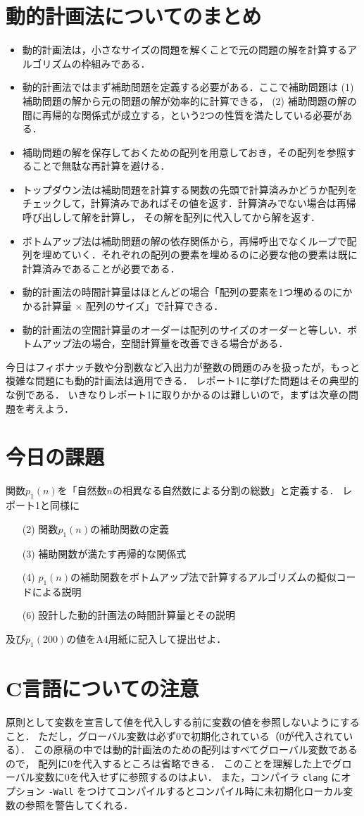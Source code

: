 \documentclass[a4paper,twoside,onecolumn,openany,article]{memoir}
\theoremstyle{remark}
\begin{document}
\section{動的計画法についてのまとめ}
\begin{itemize}
\item 動的計画法は，小さなサイズの問題を解くことで元の問題の解を計算するアルゴリズムの枠組みである．
\item 動的計画法ではまず補助問題を定義する必要がある．ここで補助問題は (1) 補助問題の解から元の問題の解が効率的に計算できる，
(2) 補助問題の解の間に再帰的な関係式が成立する，という2つの性質を満たしている必要がある．
\item 補助問題の解を保存しておくための配列を用意しておき，その配列を参照することで無駄な再計算を避ける．
\item トップダウン法は補助問題を計算する関数の先頭で計算済みかどうか配列をチェックして，計算済みであればその値を返す．計算済みでない場合は再帰呼び出しして解を計算し，
その解を配列に代入してから解を返す．
\item ボトムアップ法は補助問題の解の依存関係から，再帰呼出でなくループで配列を埋めていく．それぞれの配列の要素を埋めるのに必要な他の要素は既に計算済みであることが必要である．
\item 動的計画法の時間計算量はほとんどの場合「配列の要素を1つ埋めるのにかかる計算量 $\times$ 配列のサイズ」で計算できる．
\item 動的計画法の空間計算量のオーダーは配列のサイズのオーダーと等しい．ボトムアップ法の場合，空間計算量を改善できる場合がある．
\end{itemize}
今日はフィボナッチ数や分割数など入出力が整数の問題のみを扱ったが，もっと複雑な問題にも動的計画法は適用できる．
レポート1に挙げた問題はその典型的な例である．
いきなりレポート1に取りかかるのは難しいので，まずは次章の問題を考えよう．


\section{今日の課題}\label{sec:assignment}
関数$p_1(n)$を「自然数$n$の相異なる自然数による分割の総数」と定義する．
レポート1と同様に
\begin{enumerate}
\item[(2)] 関数$p_1(n)$の補助関数の定義
\item[(3)] 補助関数が満たす再帰的な関係式
\item[(4)] $p_1(n)$の補助関数をボトムアップ法で計算するアルゴリズムの擬似コードによる説明
\item[(6)] 設計した動的計画法の時間計算量とその説明
\end{enumerate}
及び$p_1(200)$の値をA4用紙に記入して提出せよ．

\section*{C言語についての注意}
原則として変数を宣言して値を代入しする前に変数の値を参照しないようにすること．
ただし，グローバル変数は必ず0で初期化されている（0が代入されている）．
この原稿の中では動的計画法のための配列はすべてグローバル変数であるので，
配列に0を代入するところは省略できる．
このことを理解した上でグローバル変数に0を代入せずに参照するのはよい．
また，コンパイラ \texttt{clang} にオプション \texttt{-Wall} をつけてコンパイルするとコンパイル時に未初期化ローカル変数の参照を警告してくれる．
\end{document}
